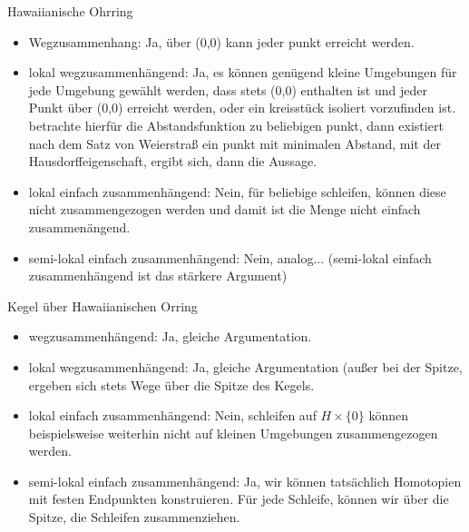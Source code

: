 \documentclass{scrartcl}
\begin{document}
\begin{aufgabe}
 \begin{seg}{Hawaiianische Ohrring}
 \begin{itemize}
 \item Wegzusammenhang: Ja, über (0,0) kann jeder punkt erreicht werden.
 \item lokal wegzusammenhängend: Ja, es können genügend kleine Umgebungen für jede Umgebung gewählt werden, dass stets (0,0) enthalten ist und jeder Punkt über (0,0) erreicht werden, oder ein kreisstück isoliert vorzufinden ist. betrachte hierfür die Abstandsfunktion zu beliebigen punkt, dann existiert nach dem Satz von Weierstraß ein punkt mit minimalen Abstand, mit der Hausdorffeigenschaft, ergibt sich, dann die Aussage.
 \item lokal einfach zusammenhängend: Nein, für beliebige schleifen, können diese nicht zusammengezogen werden und damit ist die Menge nicht einfach zusammenängend.  
 \item semi-lokal einfach zusammenhängend: Nein, analog... (semi-lokal einfach zusammenhängend ist das stärkere Argument)
 \end{itemize}
 \end{seg}

 \begin{seg}{Kegel über Hawaiianischen Orring}
 \begin{itemize}
 \item wegzusammenhängend: Ja, gleiche Argumentation.
 \item lokal wegzusammenhängend: Ja, gleiche Argumentation (außer bei der Spitze, ergeben sich stets Wege über die Spitze des Kegels.
 \item lokal einfach zusammenhängend: Nein,  schleifen auf $ H \times \{0\} $ können beispielsweise weiterhin nicht auf kleinen Umgebungen zusammengezogen werden. 
 \item semi-lokal einfach zusammenhängend: Ja,  wir können tatsächlich Homotopien mit festen Endpunkten konstruieren. Für jede Schleife, können wir über die Spitze, die Schleifen zusammenziehen.
 \end{itemize}
 \end{seg}
\end{aufgabe}
\end{document}

